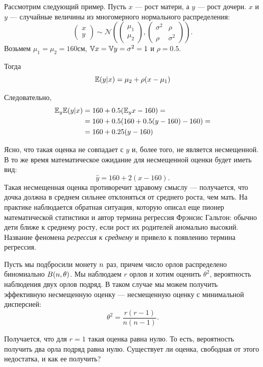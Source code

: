 \begin{example}
Рассмотрим следующий пример.
Пусть $x$ --- рост матери, а $y$ --- рост дочери.
$x$ и $y$ --- случайные величины из многомерного нормального распределения:
\[
\begin{pmatrix}
x \\ y
\end{pmatrix} \sim
\mathcal{N}
\left( 
\begin{pmatrix}
\mu_1 \\ \mu_2
\end{pmatrix},
\begin{pmatrix}
\sigma^2 & \rho \\ \rho & \sigma^2
\end{pmatrix}
\right).
\]
Возьмем $\mu_1 = \mu_2 = 160 \text{см}$, $\mathbb{V} x = \mathbb{V} y = \sigma^2 = 1$ и $\rho = 0.5$.

Тогда 
\[
\mathbb{E} (y | x) = \mu_2 + \rho (x - \mu_1)
\]

Следовательно,
\begin{align*}
\mathbb{E}_y \mathbb{E} (y | x) &= 160 + 0.5 (\mathbb{E}_y x - 160) = \\
                    &= 160 + 0.5 (160 + 0.5(y - 160) - 160) = \\
                    &= 160 + 0.25 (y - 160)
\end{align*}

Ясно, что такая оценка не совпадает с $y$ и, более того, не является несмещенной.
В то же время математическое ожидание для несмещенной оценки будет иметь вид:
\[
\hat{y} = 160 + 2 (x - 160).
\]
Такая несмещенная оценка противоречит здравому смыслу ---
получается, что дочка должна в среднем сильнее отклоняться от среднего роста, чем мать.
На практике наблюдается обратная ситуация, которую описал еще пионер математической статистики и автор термина регрессия Фрэнсис Гальтон:
обычно дети ближе к среднему росту, если рост их родителей аномально высокий.
Название феномена \emph{регрессия к среднему} и привело к появлению термина регрессия.

\end{example}

\begin{example}
Пусть мы подбросили монету $n$ раз, 
причем число орлов распределено биномиально $B(n, \theta)$.
Мы наблюдаем $r$ орлов и хотим оценить $\theta^2$,
вероятность наблюдения двух орлов подряд.
В таком случае мы можем получить эффективную несмещенную оценку --- несмещенную оценку с минимальной дисперсией:
\[
\hat{\theta^2} = \frac{r(r - 1)}{n (n - 1)}.
\]

Получается, что для $r = 1$ такая оценка равна нулю.
То есть, вероятность получить два орла подряд равна нулю.
Существует ли оценка, свободная от этого недостатка, и как ее получить?
\end{example}


